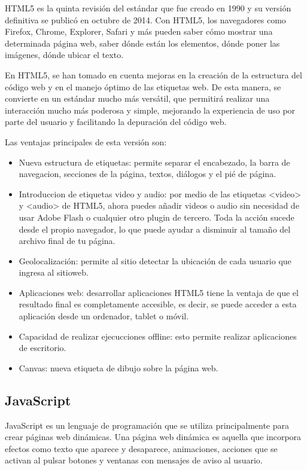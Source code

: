 \documentclass[a4paper, 12pt]{book}
\begin{document}
HTML5 es la quinta revisi\'on del est\'andar que fue creado en 1990 y su versi\'on definitiva se
public\'o en octubre de 2014. Con HTML5, los navegadores como Firefox, Chrome, Explorer,
Safari y m\'as pueden saber c\'omo mostrar una determinada p\'agina web, saber d\'onde est\'an los
elementos, d\'onde poner las im\'agenes, d\'onde ubicar el texto.

En HTML5, se han tomado en cuenta mejoras en la creaci\'on de la estructura del c\'odigo web
y en el manejo \'optimo de las etiquetas web. De esta manera, se convierte en un est\'andar mucho
m\'as vers\'atil, que permitir\'a realizar una interacci\'on mucho m\'as poderosa y simple, mejorando
la experiencia de uso por parte del usuario y facilitando la depuraci\'on del c\'odigo web.

Las ventajas principales de esta versi\'on son:

\begin{itemize}
  \item Nueva estructura de etiquetas: permite separar el encabezado, la barra de navegacion, secciones de la p\'agina, textos, di\'alogos y el pi\'e de p\'agina.
 \item Introduccion de etiquetas video y audio: por medio de las etiquetas <video> y <audio> de HTML5, ahora puedes a\~nadir videos o audio sin necesidad de usar Adobe Flash o cualquier otro plugin de tercero. Toda la acci\'on sucede desde el propio navegador, lo que puede ayudar a disminuir al tama\~no del archivo final de tu p\'agina. 
 \item Geolocalizaci\'on: permite al sitio detectar la ubicaci\'on de cada usuario que ingresa al sitioweb.
 \item Aplicaciones web: desarrollar aplicaciones HTML5 tiene la ventaja de que el resultado final es completamente accesible, es decir, se puede acceder a esta aplicaci\'on desde un ordenador, tablet o m\'ovil.
 \item Capacidad de realizar ejecucciones offline: esto permite realizar aplicaciones de escritorio.
 \item Canvas: nueva etiqueta de dibujo sobre la p\'agina web.

\end{itemize}

\subsection{JavaScript}
\label{subsec:estilo}

JavaScript es un lenguaje de programaci\'on que se utiliza principalmente para crear p\'aginas
web din\'amicas. Una p\'agina web din\'amica es aquella que incorpora efectos como texto que
aparece y desaparece, animaciones, acciones que se activan al pulsar botones y ventanas con
mensajes de aviso al usuario.
\end{document}
